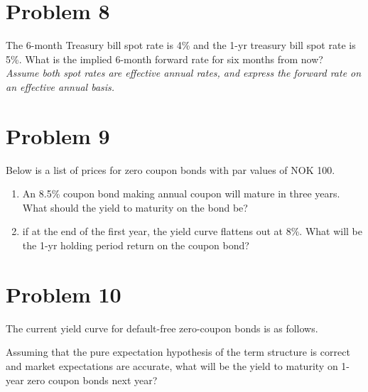\documentclass[12]{article}
\begin{document}
\color{black}
\section*{Problem 8}
The 6-month Treasury bill spot rate is 4\% and the 1-yr treasury bill spot rate is 5\%. What is the implied 6-month forward rate for six months from now?\\
\textit{Assume both spot rates are effective annual rates, and express the forward rate on an effective annual basis.}

\color{black}
\section*{Problem 9}
Below is a list of prices for zero coupon bonds with par values of NOK 100.
\begin{table}[H]
\centering
{}
\label{tab:my-table}
\end{table}

\begin{enumerate}
    \item[a)] An 8.5\% coupon bond making annual coupon will mature in three years. What should the yield to maturity on the bond be?
    \item[b)] if at the end of the first year, the yield curve flattens out at 8\%. What will be the 1-yr holding period return on the coupon bond?
\end{enumerate}




\color{black}
\section*{Problem 10}
The current yield curve for default-free zero-coupon bonds is as follows.
\begin{table}[H]
\centering
{}
\label{tab:my-table}
\end{table}
Assuming that the pure expectation hypothesis of the term structure is correct and market expectations are accurate, what will be the yield to maturity on 1-year zero coupon bonds next year?
\end{document}
